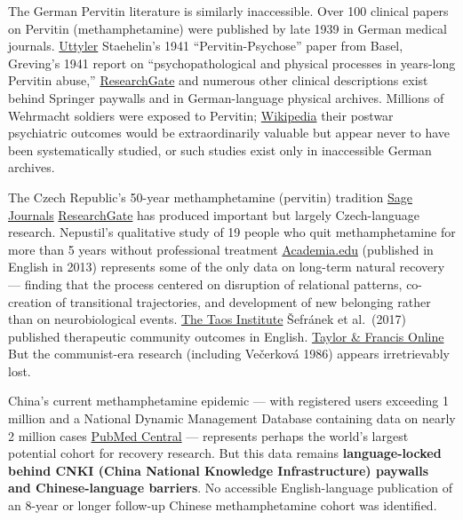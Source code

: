 The German Pervitin literature is similarly inaccessible. Over 100 clinical papers on Pervitin (methamphetamine) were published by late 1939 in German medical journals. \href{https://scholarworks.uttyler.edu/cgi/viewcontent.cgi?article=1001&context=senior_projects}{Uttyler} Staehelin's 1941 ``Pervitin-Psychose'' paper from Basel, Greving's 1941 report on ``psychopathological and physical processes in years-long Pervitin abuse,'' \href{https://www.researchgate.net/publication/275135440_Speed_in_the_Third_Reich_Metamphetamine_Pervitin_Use_and_a_Drug_History_From_Below}{ResearchGate} and numerous other clinical descriptions exist behind Springer paywalls and in German-language physical archives. Millions of Wehrmacht soldiers were exposed to Pervitin; \href{https://en.wikipedia.org/wiki/Drug_policy_of_Nazi_Germany}{Wikipedia} their postwar psychiatric outcomes would be extraordinarily valuable but appear never to have been systematically studied, or such studies exist only in inaccessible German archives.

The Czech Republic's 50-year methamphetamine (pervitin) tradition \href{https://journals.sagepub.com/doi/10.1177/002204260703700108}{Sage Journals} \href{https://www.researchgate.net/publication/354534700_Methamphetamine_use_and_consequences_in_context_of_drug_situation_in_the_Czech_Republic}{ResearchGate} has produced important but largely Czech-language research. Nepustil's qualitative study of 19 people who quit methamphetamine for more than 5 years without professional treatment \href{https://www.academia.edu/35726007/Recovered_without_Treatment_The_Process_of_Abandoning_Crystal_Meth_Use_without_Professional_Help_Pavel_Nepustil_A_Taos_Institute_Publication}{Academia.edu} (published in English in 2013) represents some of the only data on long-term natural recovery --- finding that the process centered on disruption of relational patterns, co-creation of transitional trajectories, and development of new belonging rather than on neurobiological events. \href{https://www.taosinstitute.net/product/recovered-without-treatment-the-process-of-abandoning-crystal-meth-use-without-professional-help-by-pavel-nepustil}{The Taos Institute} Šefránek et al.~(2017) published therapeutic community outcomes in English. \href{https://www.tandfonline.com/doi/full/10.1080/1556035X.2017.1280718}{Taylor \& Francis Online} But the communist-era research (including Večerková 1986) appears irretrievably lost.

China's current methamphetamine epidemic --- with registered users exceeding 1 million and a National Dynamic Management Database containing data on nearly 2 million cases \href{https://pmc.ncbi.nlm.nih.gov/articles/PMC9096246/}{PubMed Central} --- represents perhaps the world's largest potential cohort for recovery research. But this data remains \textbf{language-locked behind CNKI (China National Knowledge Infrastructure) paywalls and Chinese-language barriers}. No accessible English-language publication of an 8-year or longer follow-up Chinese methamphetamine cohort was identified.

